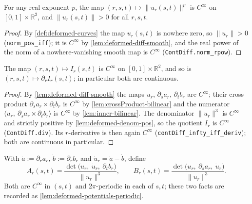 \begin{lemma}
    \label{lem:deformed-denom-pos}
    \leanok
    For any real exponent $p$, the map $(r,s,t)\mapsto\lVert u_r(s,t)\rVert^{p}$ is
    $C^\infty$ on $[0,1]\times\mathbb{R}^2$, and $\lVert u_r(s,t)\rVert>0$ for all
    $r,s,t$.
\end{lemma}
\begin{proof}
    By \cref{def:deformed-curves} the map $u_r(s,t)$ is nowhere zero, so
    $\lVert u_r\rVert>0$ (\texttt{norm\_pos\_iff}); it is $C^\infty$ by
    \cref{lem:deformed-diff-smooth}, and the real power of the norm of a
    nowhere-vanishing smooth map is $C^\infty$ (\texttt{ContDiff.norm\_rpow}).
\end{proof}

\begin{lemma}
    \label{lem:deformed-integrand-smooth}
    The map $(r,s,t)\mapsto I_r(s,t)$ is $C^\infty$ on $[0,1]\times\mathbb{R}^2$, and
    so is $(r,s,t)\mapsto\partial_r I_r(s,t)$; in particular both are continuous.
\end{lemma}
\begin{proof}
    By \cref{lem:deformed-diff-smooth} the maps $u_r$, $\partial_s a_r$,
    $\partial_t b_r$ are $C^\infty$; their cross product $\partial_s a_r\times
    \partial_t b_r$ is $C^\infty$ by \cref{lem:crossProduct-bilinear} and the
    numerator $\langle u_r,\ \partial_s a_r\times\partial_t b_r\rangle$ is $C^\infty$
    by \cref{lem:inner-bilinear}. The denominator $\lVert u_r\rVert^{3}$ is $C^\infty$
    and strictly positive by \cref{lem:deformed-denom-pos}, so the quotient $I_r$ is
    $C^\infty$ (\texttt{ContDiff.div}). Its $r$-derivative is then again $C^\infty$
    (\texttt{contDiff\_infty\_iff\_deriv}); both are continuous in particular.
\end{proof}

\begin{definition}
    \label{def:divergence-potentials}
    With $\dot a := \partial_r a_r$, $\dot b := \partial_r b_r$ and
    $\dot u_r = \dot a - \dot b$, define
    \[
        A_r(s,t) = \frac{\det\bigl(u_r,\ \dot u_r,\ \partial_t b_r\bigr)}{\lVert u_r\rVert^{3}},
        \qquad
        B_r(s,t) = \frac{\det\bigl(u_r,\ \partial_s a_r,\ \dot u_r\bigr)}{\lVert u_r\rVert^{3}} .
    \]
    Both are $C^\infty$ in $(s,t)$ and $2\pi$-periodic in each of $s,t$; these two
    facts are recorded as \cref{lem:deformed-potentials-periodic}.
\end{definition}

